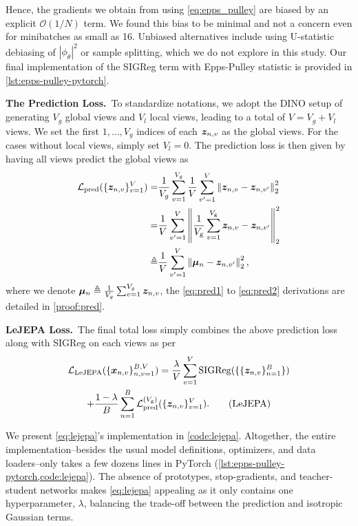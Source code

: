 Hence, the gradients we obtain from using \eqref{eq:epps_pulley} are biased by an explicit $\mathcal{O}(1/N)$ term. We found this bias to be minimal and not a concern even for minibatches as small as 16. Unbiased alternatives include using U-statistic debiasing of $|\phi_\theta|^2$ or sample splitting, which we do not explore in this study. Our final implementation of the SIGReg term with Epps-Pulley statistic is provided in \cref{lst:epps-pulley-pytorch}.
 



{\bf The Prediction Loss.}~To standardize notations, we adopt the DINO \citep{caron2021emerging} setup of generating $V_{g}$ global views and $V_{l}$ local views, leading to a total of $V=V_{g}+V_{l}$ views. We set the first $1,\dots,V_{g}$ indices of each ${\bm{z}}_{n,v}$ as the global views. For the cases without local views, simply set $V_{l}=0$. The prediction loss is then given by having all views predict the global views as
\begin{align}
    \mathcal{L}_{\rm pred}(\{{\bm{z}}_{n,v}\}_{v=1}^{V})=&\frac{1}{V_g}\sum_{v=1}^{V_g}\frac{1}{V}\sum_{v'=1}^{V}\left\| {\bm{z}}_{n,v} - {\bm{z}}_{n,v'} \right\|_2^2\label{eq:pred1}\\
    =&\frac{1}{V}\sum_{v'=1}^{V}\left\| \frac{1}{V_{\rm g}}\sum_{v=1}^{V_{\rm g}}{\bm{z}}_{n,v} - {\bm{z}}_{n,v'} \right\|_2^2\label{eq:pred2}\\
    \triangleq& \frac{1}{V}\sum_{v'=1}^{V}\left\| \bm{\mu}_{n} - {\bm{z}}_{n,v'} \right\|_2^2,\label{eq:pred_as}
\end{align}
where we denote $\bm{\mu}_n \triangleq \frac{1}{V_g}\sum_{v=1}^{V_g}{\bm{z}}_{n,v}$, the \cref{eq:pred1} to \cref{eq:pred2} derivations are detailed in \cref{proof:pred}.


{\bf LeJEPA Loss.}~The final total loss simply combines the above prediction loss along with SIGReg on each views as per
\begin{multline}
    \mathcal{L}_{\rm LeJEPA}(\{{\bm{x}}_{n,v}\}_{n,v=1}^{B,V})=\frac{\lambda}{V}\sum_{v=1}^{V}{\rm SIGReg}(\{\{{\bm{z}}_{n,v}\}_{n=1}^{B}\})\\
    +\frac{1-\lambda}{B}\sum_{n=1}^{B}\mathcal{L}^{(V_{\rm g})}_{\rm pred}(\{{\bm{z}}_{n,v}\}_{v=1}^{V}).\tag{LeJEPA}\label{eq:lejepa}
\end{multline}





We present \eqref{eq:lejepa}'s implementation in \cref{code:lejepa}. Altogether, the entire implementation--besides the usual model definitions, optimizers, and data loaders--only takes a few dozens lines in PyTorch (\cref{lst:epps-pulley-pytorch,code:lejepa}). The absence of prototypes, stop-gradients, and teacher-student networks 
makes \eqref{eq:lejepa} appealing as it only contains one hyperparameter, $\lambda$, balancing the trade-off between the prediction and isotropic Gaussian terms.




